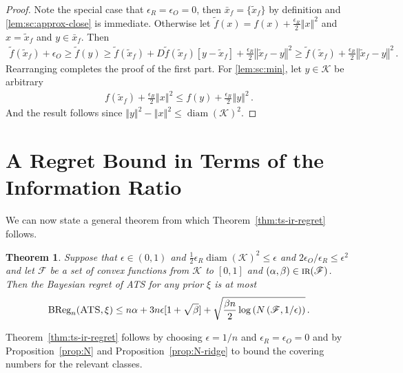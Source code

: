 \documentclass[letter, 12pt]{report}
\newcommand{\epsR}{{\epsilon_R}}
\newcommand{\epsO}{{\epsilon_O}}
\newcommand{\BReg}{\textrm{BReg}}
\newcommand{\norm}[1]{\left \Vert  #1 \right \Vert}
\newcommand{\cK}{\mathcal K}
\newcommand{\sF}{\mathscr F}
\newcommand{\diam}{\operatorname{diam}}
\newcommand{\1}{\mathbf{1}}
\newcommand{\IR}{\operatorname{\textsc{ir}}}
\newcommand{\ats}{\textsc{ATS}}
\theoremstyle{plain}
\newtheorem{theorem}{Theorem}
\theoremstyle{definition}
\theoremstyle{remark}
\begin{document}
\begin{proof}
    Note the special case that $\epsR = \epsO = 0$, then $\bar x_f = \{\tilde x_f\}$ by definition and \ref{lem:sc:approx-close} is immediate.
    Otherwise
    let $\tilde f(x) = f(x) + \frac{\epsR}{2} \norm{x}^2$
    and $x = \tilde x_f$ and $y \in \bar x_f$. Then
    \begin{align*}
        \tilde f(\tilde x_f) + \epsO
        \geq \tilde f(y)
        \geq \tilde f(\tilde x_f) + D\tilde f(\tilde x_f)[y - \tilde x_f] + \frac{\epsR}{2} \norm{\tilde x_f - y}^2
        \geq \tilde f(\tilde x_f) + \frac{\epsR}{2} \norm{\tilde x_f - y}^2 \,.
    \end{align*}
    Rearranging completes the proof of the first part.
    For \ref{lem:sc:min}, let $y \in \cK$ be arbitrary
    \begin{align*}
        f(\tilde x_f) + \frac{\epsR}{2} \norm{x}^2 \leq f(y) + \frac{\epsR}{2} \norm{y}^2  \,.
    \end{align*}
    And the result follows since $\norm{y}^2 - \norm{x}^2 \leq \diam(\cK)^2$.
\end{proof}


\section{A Regret Bound in Terms of the Information Ratio}\label{sec:ir-general}
We can now state a general theorem from which Theorem~\ref{thm:ts-ir-regret} follows.

\begin{theorem}\label{thm:ir-general}
    Suppose that $\epsilon \in (0,1)$ and $\frac{1}{2} \epsR \diam(\cK)^2 \leq \epsilon$ and $2\epsO/\epsR \leq \epsilon^2$
    and let $\sF$ be a set of convex functions from $\cK$ to $[0,1]$ and $(\alpha, \beta) \in \IR(\sF)$.
    Then the Bayesian regret of \ats{} for any prior $\xi$ is at most
    \begin{align*}
        \BReg_n(\ats, \xi) \leq n \alpha + 3n\epsilon[1 + \sqrt{\beta}] + \sqrt{\frac{\beta n}{2} \log\left(N\left(\sF, 1/\epsilon\right)\right)} \,.
    \end{align*}
\end{theorem}

Theorem~\ref{thm:ts-ir-regret} follows by choosing $\epsilon = 1/n$ and $\epsR = \epsO = 0$ and by
Proposition~\ref{prop:N} and Proposition~\ref{prop:N-ridge} to bound the covering numbers for the relevant classes.
\end{document}
